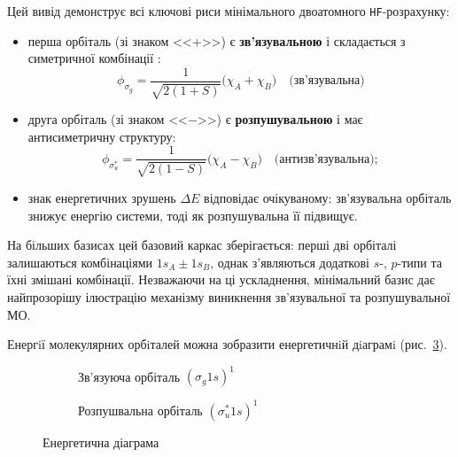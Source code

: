 Цей вивід демонструє всі ключові риси мінімального двоатомного \texttt{HF}-розрахунку:

\begin{itemize}
	\item перша орбіталь (зі знаком <<$+$>>) є \textbf{зв’язувальною} і складається з симетричної комбінації :
	      \begin{equation*}
		      \phi_{\sigma_g}  = \frac{1}{\sqrt{2(1+S)}} \bigl(\chi_A + \chi_B\bigr) \quad \text{(зв'язувальна)}
	      \end{equation*}
	\item друга орбіталь (зі знаком <<$-$>>) є \textbf{розпушувальною} і має антисиметричну структуру:
	      \begin{equation*}
		      \phi_{\sigma_u^*}  = \frac{1}{\sqrt{2(1-S)}} \bigl(\chi_A - \chi_B\bigr) \quad \text{(антизв'язувальна)};
	      \end{equation*}
	\item знак енергетичних зрушень $\Delta E$ відповідає очікуваному: зв’язувальна орбіталь знижує енергію системи, тоді як розпушувальна її підвищує.
\end{itemize}

На більших базисах цей базовий каркас зберігається: перші дві орбіталі залишаються комбінаціями $1s_A \pm 1s_B$, однак з’являються додаткові $s$-, $p$-типи та їхні змішані комбінації. Незважаючи на ці ускладнення, мінімальний базис дає найпрозорішу ілюстрацію механізму виникнення зв’язувальної та розпушувальної МО.


Енергiї молекулярних орбiталей можна зобразити енергетичнiй дiаграмi (рис.~\ref{pic:E_diarramm}).


\begin{figure}[h!]\centering
	\begin{subfigure}[t]{0.45\linewidth}\centering
		\begin{MOdiagram}[style = fancy, distance = 5cm, AO-width = 15pt,names, labels]
			\EnergyAxis[title=E,head=stealth]
		\end{MOdiagram}
		\caption{Зв'язуюча орбіталь $(\sigma_g1s)^1$}
		\label{pic:E_diarramm_bond}
	\end{subfigure}
	\begin{subfigure}[t]{0.45\linewidth}\centering
		\begin{MOdiagram}[style = fancy, distance = 5cm, AO-width = 15pt,names, labels]
			\EnergyAxis[title=E,head=stealth]
		\end{MOdiagram}
		\caption{Розпушвальна орбіталь $(\sigma^*_u1s)^1$}
		\label{pic:E_diarramm_antibond}
	\end{subfigure}
	\caption{Енергетична діаграма}
	\label{pic:E_diarramm}
\end{figure}

